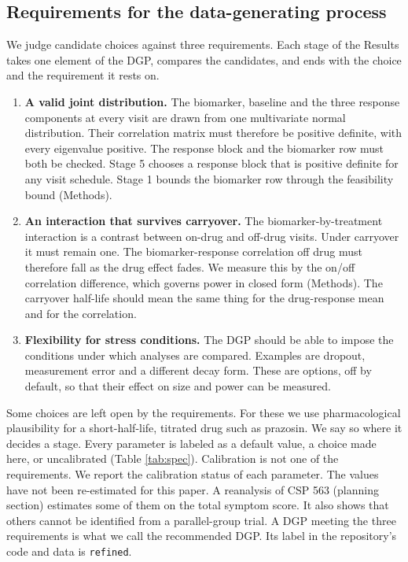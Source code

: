 \documentclass[
  11pt,
]{article}
\providecommand{\tightlist}{%
  \setlength{\itemsep}{0pt}\setlength{\parskip}{0pt}}
\begin{document}
\subsection{Requirements for the data-generating process}\label{requirements-for-the-data-generating-process}

We judge candidate choices against three requirements. Each stage of
the Results takes one element of the DGP, compares the candidates,
and ends with the choice and the requirement it rests on.

\begin{enumerate}
\def\labelenumi{\arabic{enumi}.}
\tightlist
\item
  \textbf{A valid joint distribution.} The biomarker, baseline and the
  three response components at every visit are drawn from one
  multivariate normal distribution. Their correlation matrix must
  therefore be positive definite, with every eigenvalue positive. The
  response block and the biomarker row must both be
  checked. Stage 5 chooses a response block that is positive definite
  for any visit schedule. Stage 1 bounds the biomarker row through the
  feasibility bound (Methods).
\item
  \textbf{An interaction that survives carryover.} The
  biomarker-by-treatment interaction is a contrast between on-drug and
  off-drug visits. Under carryover it must remain one. The
  biomarker-response correlation off drug must therefore fall as the
  drug effect fades. We measure this by the on/off correlation
  difference, which governs power in closed form (Methods). The
  carryover half-life should mean the same thing for the
  drug-response mean and for the correlation.
\item
  \textbf{Flexibility for stress conditions.} The DGP should be able to
  impose the conditions under which analyses are compared. Examples
  are dropout, measurement error and a different decay form. These are
  options, off by default, so that their effect on size and power can
  be measured.
\end{enumerate}

Some choices are left open by the requirements. For these we use
pharmacological plausibility for a short-half-life, titrated drug such
as prazosin. We say so where it decides a stage. Every parameter is
labeled as a default value, a choice made here, or uncalibrated (Table
\ref{tab:spec}). Calibration is not one of the requirements. We
report the calibration status of each parameter. The values
have not been re-estimated for this paper. A reanalysis of CSP 563
(planning section) estimates some of them on the total symptom score.
It also shows that others cannot be identified from a parallel-group
trial. A DGP meeting the three requirements is what we call the
recommended DGP. Its label in the repository's code and data is
\texttt{refined}.
\end{document}
